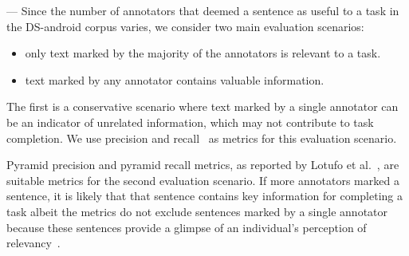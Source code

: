 --- Since the number of annotators that deemed a sentence as useful to a task 
in the \acs{DS-android} corpus varies, we consider 
two main evaluation scenarios:


\begin{itemize}
    \item only text marked by the majority of the annotators is relevant to a task.
    
    \item text marked by any annotator contains valuable information.
\end{itemize}
 


The first is a conservative scenario where text marked by a single annotator can be an indicator of unrelated information, which may not contribute to task completion. 
We use precision and recall~\cite{Manning2009IR} as metrics for this evaluation scenario. 


Pyramid 
precision and pyramid recall metrics, as reported by Lotufo et al.~\cite{Nenkova2004, Lotufo2012}, are suitable metrics for the second evaluation scenario. 
If more annotators marked a sentence, it is likely that that sentence contains key information for completing a task albeit the metrics do not exclude sentences marked by a single annotator because these sentences provide a glimpse of an individual's perception of relevancy~\cite{Petrosyan2015}. 





% 





